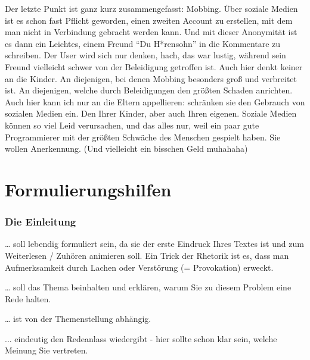  

Der letzte Punkt ist ganz kurz zusammengefasst: Mobbing. Über soziale Medien ist es schon fast Pflicht geworden, einen zweiten Account zu erstellen, mit dem man nicht in Verbindung gebracht werden kann. Und mit dieser Anonymität ist es dann ein Leichtes, einem Freund “Du H*rensohn” in die Kommentare zu schreiben. Der User wird sich nur denken, hach, das war lustig, während sein Freund vielleicht schwer von der Beleidigung getroffen ist. Auch hier denkt keiner an die Kinder. An diejenigen, bei denen Mobbing besonders groß und verbreitet ist. An diejenigen, welche durch Beleidigungen den größten Schaden anrichten. Auch hier kann ich nur an die Eltern appellieren: schränken sie den Gebrauch von sozialen Medien ein. Den Ihrer Kinder, aber auch Ihren eigenen. Soziale Medien können so viel Leid verursachen, und das alles nur, weil ein paar gute Programmierer mit der größten Schwäche des Menschen gespielt haben. Sie wollen Anerkennung. (Und vielleicht ein bisschen Geld muhahaha) 


\section{Formulierungshilfen}
\subsubsection{Die Einleitung}
\begin{compactitem}
    \item … soll lebendig formuliert sein, da sie der erste Eindruck Ihres Textes ist und zum Weiterlesen / Zuhören animieren soll. Ein Trick der Rhetorik ist es, dass man Aufmerksamkeit durch Lachen oder Verstörung (= Provokation) erweckt. 
    \item  … soll das Thema beinhalten und erklären, warum Sie zu diesem Problem eine Rede halten. 
    \item    … ist von der Themenstellung abhängig. 
    \item  ... eindeutig den Redeanlass wiedergibt - hier sollte schon klar sein, welche Meinung Sie vertreten.  
\end{compactitem}
